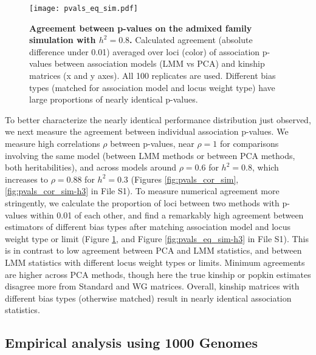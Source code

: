 \documentclass[9pt,twocolumn,twoside]{gsajnl}
\begin{document}
\begin{figure}[tb]
  \centering
  \texttt{[image: pvals\_eq\_sim.pdf]}
  \caption{
    {\bf Agreement between p-values on the admixed family simulation with $h^2=0.8$.}
    Calculated agreement (absolute difference under 0.01) averaged over loci (color) of association p-values between association models (LMM vs PCA) and kinship matrices (x and y axes).
    All 100 replicates are used.
    Different bias types (matched for association model and locus weight type) have large proportions of nearly identical p-values.
    }
  \label{fig:pvals_eq_sim}
\end{figure}

To better characterize the nearly identical performance distribution just observed, we next measure the agreement between individual association p-values.
We measure high correlations $\rho$ between p-values, near $\rho = 1$ for comparisons involving the same model (between LMM methods or between PCA methods, both heritabilities), and across models around $\rho = 0.6$ for $h^2=0.8$, which increases to $\rho = 0.88$ for $h^2=0.3$ (Figures \ref*{fig:pvals_cor_sim}, \ref*{fig:pvals_cor_sim-h3} in File S1).
To measure numerical agreement more stringently, we calculate the proportion of loci between two methods with p-values within 0.01 of each other, and find a remarkably high agreement between estimators of different bias types after matching association model and locus weight type or limit (Figure \ref{fig:pvals_eq_sim}, and Figure \ref*{fig:pvals_eq_sim-h3} in File S1).
This is in contrast to low agreement between PCA and LMM statistics, and between LMM statistics with different locus weight types or limits.
Minimum agreements are higher across PCA methods, though here the true kinship or popkin estimates disagree more from Standard and WG matrices.
Overall, kinship matrices with different bias types (otherwise matched) result in nearly identical association statistics.

\subsection{Empirical analysis using 1000 Genomes}
\end{document}
